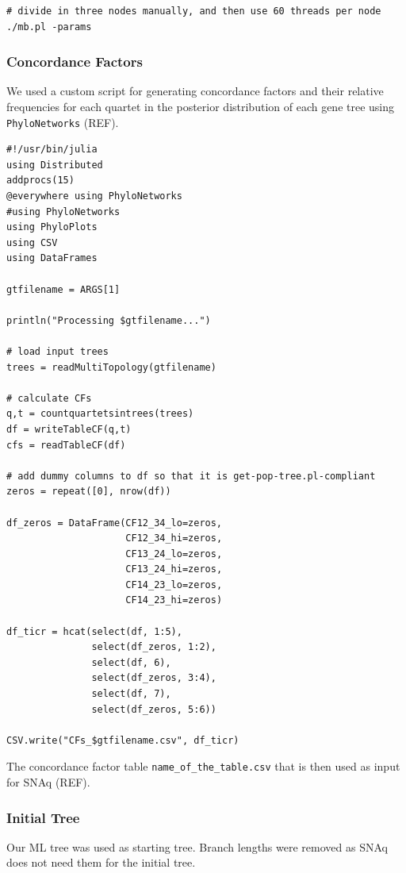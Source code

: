 \documentclass[utf8]{frontiers_suppmat} %
\begin{document}
\begin{verbatim}
# divide in three nodes manually, and then use 60 threads per node
./mb.pl -params
\end{verbatim}

\subsubsection{Concordance Factors}

We used a custom script for generating concordance factors and their relative frequencies for each quartet in the posterior distribution of each gene tree using \texttt{PhyloNetworks} (REF).

\begin{verbatim}
#!/usr/bin/julia
using Distributed
addprocs(15)
@everywhere using PhyloNetworks
#using PhyloNetworks
using PhyloPlots
using CSV
using DataFrames

gtfilename = ARGS[1]

println("Processing $gtfilename...")

# load input trees
trees = readMultiTopology(gtfilename)

# calculate CFs
q,t = countquartetsintrees(trees)
df = writeTableCF(q,t)
cfs = readTableCF(df)

# add dummy columns to df so that it is get-pop-tree.pl-compliant
zeros = repeat([0], nrow(df))

df_zeros = DataFrame(CF12_34_lo=zeros,
                     CF12_34_hi=zeros,
                     CF13_24_lo=zeros,
                     CF13_24_hi=zeros,
                     CF14_23_lo=zeros,
                     CF14_23_hi=zeros)

df_ticr = hcat(select(df, 1:5),
               select(df_zeros, 1:2),
               select(df, 6),
               select(df_zeros, 3:4),
               select(df, 7),
               select(df_zeros, 5:6))

CSV.write("CFs_$gtfilename.csv", df_ticr)
\end{verbatim}

The concordance factor table \texttt{name\_of\_the\_table.csv} that is then used as input for SNAq (REF).

\subsubsection{Initial Tree}

Our ML tree was used as starting tree. Branch lengths were removed as SNAq does not need them for the initial tree.
\end{document}
